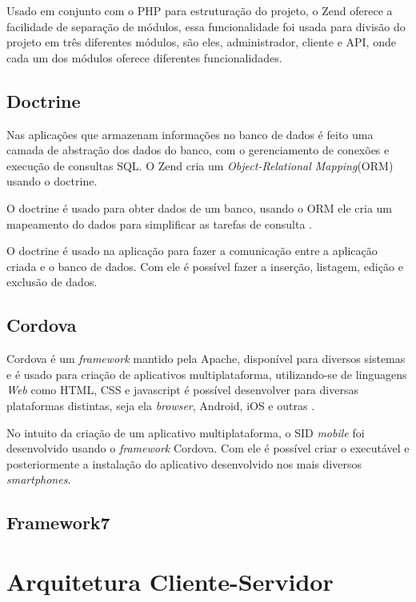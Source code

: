 Usado em conjunto com o PHP para estruturação do projeto, o Zend oferece a facilidade de separação de módulos, essa funcionalidade foi usada para divisão do projeto em três diferentes módulos, são eles, administrador, cliente e API, onde cada um dos módulos oferece diferentes funcionalidades.

\subsection{Doctrine}
Nas aplicações que armazenam informações no banco de dados é feito uma camada de abstração dos dados do banco, com o gerenciamento de conexões e execução de consultas SQL. O Zend cria um \textit{Object-Relational Mapping}(ORM) usando o doctrine.

O doctrine é usado para obter dados de um banco, usando o ORM ele cria um mapeamento do dados para simplificar as tarefas de consulta \cite[p.102]{vaswani2010}.

O doctrine é usado na aplicação para fazer a comunicação entre a aplicação criada e o banco de dados. Com ele é possível fazer a inserção, listagem, edição e exclusão de dados.

\subsection{Cordova}
Cordova é um \textit{framework} mantido pela Apache, disponível para diversos sistemas e é usado para criação de aplicativos multiplataforma, utilizando-se de linguagens \textit{Web} como HTML, CSS e javascript é possível desenvolver para diversas plataformas distintas, seja ela \textit{browser}, Android, iOS e outras \cite{prezotto2017}.

No intuito da criação de um aplicativo multiplataforma, o SID \textit{mobile} foi desenvolvido usando o \textit{framework} Cordova. Com ele é possível criar o executável e posteriormente a instalação do aplicativo desenvolvido nos mais diversos \textit{smartphones}.

\subsection{Framework7}

\section{Arquitetura Cliente-Servidor}